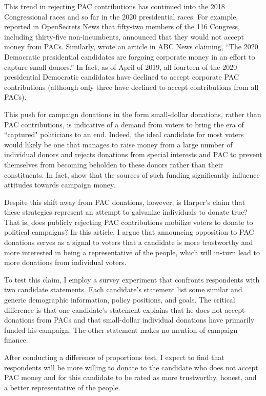 \documentclass[12pt]{article}
\begin{document}
This trend in rejecting PAC contributions has continued into the 2018 Congressional races and so far in the 2020 presidential races. For example, \citet{evers-hillstrom_democrats_2018} reported in OpenSecrets News that fifty-two members of the 116 Congress, including thirty-five non-incumbents, announced that they would not accept money from PACs. Similarly,  wrote an article in ABC News claiming, ``The 2020 Democratic presidential candidates are forgoing corporate money in an effort to capture small donors.'' In fact, as of April of 2019, all fourteen of the 2020 presidential Democratic candidates have declined to accept corporate PAC contributions (although only three have declined to accept contributions from all PACs). 

This push for campaign donations in the form small-dollar donations, rather than PAC contributions, is indicative of a demand from voters to bring the era of ``captured" politicians to an end. Indeed, the ideal candidate for most voters would likely be one that manages to raise money from a large number of individual donors and rejects donations from special interests and PAC to prevent themselves from becoming beholden to these donors rather than their constituents. In fact, \citet{bowler_campaign_2016} show that the sources of such funding significantly influence attitudes towards campaign money.  

Despite this shift away from PAC donations, however, is Harper's \citeyear{harper_2020_2019} claim that these strategies represent an attempt to galvanize individuals to donate true? That is, does publicly rejecting PAC contributions mobilize voters to donate to political campaigns?  In this article, I argue that announcing opposition to PAC donations serves as a signal to voters that a candidate is more trustworthy and more interested in being a representative of the people,  which will in-turn lead to more donations from individual voters. 

To test this claim, I employ a survey experiment that confronts respondents with two candidate statements. Each candidate's statement list some similar and generic demographic information, policy positions, and goals. The critical difference is that one candidate's statement explains that he does not accept donations from PACs and that small-dollar individual donations have primarily funded his campaign. The other statement makes no mention of campaign finance. 

After conducting a difference of proportions test, I expect to find that respondents will be more willing to donate to the candidate who does not accept PAC money and for this candidate to be rated as more trustworthy, honest, and a better representative of the people. 
\end{document}
